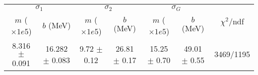 \begin{tabular}{cc|cc|cc||c}
\multicolumn{2}{c|}{$\sigma_1$} & \multicolumn{2}{|c}{$\sigma_2$} & \multicolumn{2}{|c}{$\sigma_G$}  & \multirow{2}{*}{$\chi^2/$ndf}\\
$m$ ($\times1e5$) & $b$ (MeV) & $m$ ($\times1e5$) & $b$ (MeV) & $m$ ($\times1e5$) & $b$ (MeV) & \\
\hline
8.316 $\pm$ 0.091 & 16.282 $\pm$ 0.083 & 9.72 $\pm$ 0.12 & 26.81 $\pm$ 0.17 & 15.25 $\pm$ 0.70 & 49.01 $\pm$ 0.55 & 3469/1195\\
\end{tabular}
